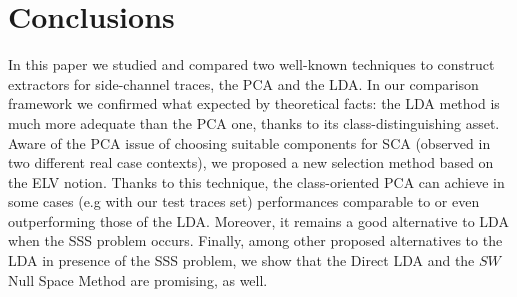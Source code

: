 \section{Conclusions}\label{sec:conclusions}

In this paper we studied and compared two well-known techniques to construct extractors for side-channel traces, the PCA and the LDA. In our comparison framework we confirmed what expected by theoretical facts: the LDA method is much more adequate than the PCA one, thanks to its class-distinguishing asset. Aware of the PCA issue of choosing suitable components for SCA (observed in two different real case contexts), we proposed a new selection method based on the ELV notion. Thanks to this technique, the class-oriented PCA can achieve in some cases (e.g with our test traces set) performances comparable to or even outperforming those of the LDA. Moreover, it remains a good alternative to LDA when the SSS problem occurs. Finally, among other proposed alternatives to the LDA in presence of the SSS problem, we show that the Direct LDA and the $SW$ Null Space Method are promising, as well.


